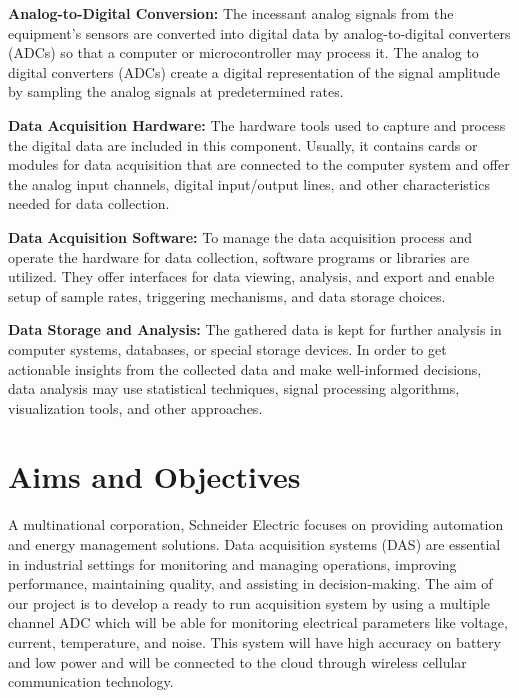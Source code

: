 \vspace{0.5cm}\par
\textbf{Analog-to-Digital Conversion:}
The incessant analog signals from the equipment's sensors are converted into digital data by analog-to-digital converters (ADCs) so that a computer or microcontroller may process it. The analog to digital converters (ADCs) create a digital representation of the signal amplitude by sampling the analog signals at predetermined rates.

\vspace{0.5cm}\par
\textbf{Data Acquisition Hardware:}
The hardware tools used to capture and process the digital data are included in this component. Usually, it contains cards or modules for data acquisition that are connected to the computer system and offer the analog input channels, digital input/output lines, and other characteristics needed for data collection.

\vspace{0.5cm}\par
\textbf{Data Acquisition Software: }
To manage the data acquisition process and operate the hardware for data collection, software programs or libraries are utilized. They offer interfaces for data viewing, analysis, and export and enable setup of sample rates, triggering mechanisms, and data storage choices.

\vspace{0.5cm}\par
\textbf{Data Storage and Analysis: }
The gathered data is kept for further analysis in computer systems, databases, or special storage devices. In order to get actionable insights from the collected data and make well-informed decisions, data analysis may use statistical techniques, signal processing algorithms, visualization tools, and other approaches.


\section{Aims and Objectives}
A multinational corporation, Schneider Electric focuses on providing automation and energy management solutions. Data acquisition systems (DAS) are essential in industrial settings for monitoring and managing operations, improving performance, maintaining quality, and assisting in decision-making. The aim of our project is to develop a ready to run acquisition system by using a multiple channel ADC which will be able for monitoring electrical parameters like voltage, current, temperature, and noise. This system will have high accuracy on battery and low power and will be connected to the cloud through wireless cellular communication technology.


